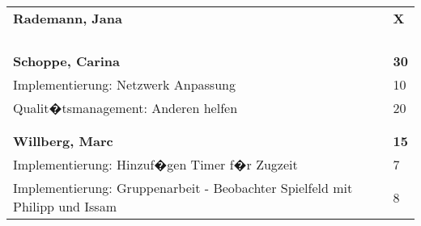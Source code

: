 \documentclass[a4paper,11pt]{scrartcl}
\begin{document}
\begin{longtable}{| p{13.8cm} | C{2.4cm} |}

	&

	\\
	\hline
	\hline


	\textbf{Rademann, Jana} & \textbf{X}\\ %
	\hline


	&

	\\
	\hline


	&

	\\
	\hline


	&

	\\
	\hline


	&

	\\
	\hline
	\hline


	\textbf{Schoppe, Carina} & \textbf{30}\\ %
	\hline

  Implementierung: Netzwerk Anpassung
	&
  10
	\\
	\hline

  Qualit�tsmanagement: Anderen helfen
	&
  20
	\\
	\hline


	&

	\\
	\hline


	&

	\\
	\hline
	\hline


	\textbf{Willberg, Marc} & \textbf{15}\\ %
	\hline

  Implementierung: Hinzuf�gen Timer f�r Zugzeit
	&
  7
	\\
	\hline

  Implementierung: Gruppenarbeit - Beobachter Spielfeld mit Philipp und Issam
	&
  8
	\\
	\hline

\end{longtable}
\end{document}
